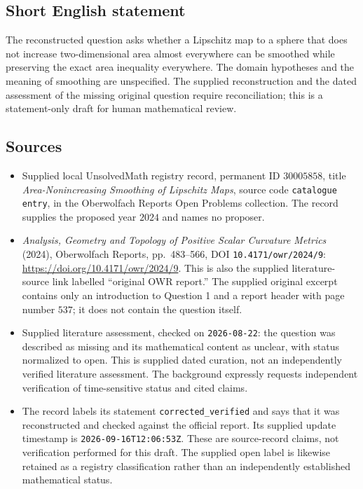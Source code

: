 \documentclass[11pt]{article}
\begin{document}
\subsection{Short English statement}
The reconstructed question asks whether a Lipschitz map to a sphere that does not increase two-dimensional area almost everywhere can be smoothed while preserving the exact area inequality everywhere. The domain hypotheses and the meaning of smoothing are unspecified. The supplied reconstruction and the dated assessment of the missing original question require reconciliation; this is a statement-only draft for human mathematical review.
\subsection{Sources}
\begin{itemize}
\item Supplied local UnsolvedMath registry record, permanent ID \(30005858\), title \emph{Area-Nonincreasing Smoothing of Lipschitz Maps}, source code \texttt{catalogue entry}, in the Oberwolfach Reports Open Problems collection. The record supplies the proposed year \(2024\) and names no proposer.
\item \emph{Analysis, Geometry and Topology of Positive Scalar Curvature Metrics} (2024), Oberwolfach Reports, pp.\ 483--566, DOI \texttt{10.4171/owr/2024/9}: \url{https://doi.org/10.4171/owr/2024/9}. This is also the supplied literature-source link labelled ``original OWR report.'' The supplied original excerpt contains only an introduction to Question 1 and a report header with page number \(537\); it does not contain the question itself.
\item Supplied literature assessment, checked on \texttt{2026-08-22}: the question was described as missing and its mathematical content as unclear, with status normalized to open. This is supplied dated curation, not an independently verified literature assessment. The background expressly requests independent verification of time-sensitive status and cited claims.
\item The record labels its statement \texttt{corrected\_verified} and says that it was reconstructed and checked against the official report. Its supplied update timestamp is \texttt{2026-09-16T12:06:53Z}. These are source-record claims, not verification performed for this draft. The supplied open label is likewise retained as a registry classification rather than an independently established mathematical status.
\end{itemize}
\end{document}
